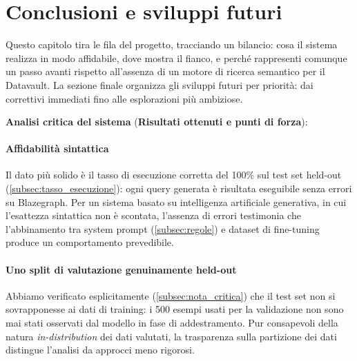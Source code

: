\chapter{Conclusioni e sviluppi futuri}\label{chap:conclusioni}

Questo capitolo tira le fila del progetto, tracciando un bilancio: cosa il sistema realizza in modo affidabile, dove mostra il fianco, e perché rappresenti comunque un passo avanti rispetto all'assenza di un motore di ricerca semantico per il Datavault.
La sezione finale organizza gli sviluppi futuri per priorità: dai correttivi immediati fino alle esplorazioni più ambiziose.

\textbf{Analisi critica del sistema} (\textbf{Risultati ottenuti e punti di forza}):\label{sec:orgoglio_modestia}

\subsubsection{Affidabilità sintattica}

Il dato più solido è il tasso di esecuzione corretta del 100\% sul test set held-out (\cref{subsec:tasso_esecuzione}): ogni query generata è risultata eseguibile senza errori su Blazegraph. Per un sistema basato su intelligenza artificiale generativa, in cui l'esattezza sintattica non è scontata, l'assenza di errori testimonia che l'abbinamento tra system prompt (\cref{subsec:regole}) e dataset di fine-tuning produce un comportamento prevedibile.

\subsubsection{Uno split di valutazione genuinamente held-out}

Abbiamo verificato esplicitamente (\cref{subsec:nota_critica}) che il test set non si sovrapponesse ai dati di training: i 500 esempi usati per la validazione non sono mai stati osservati dal modello in fase di addestramento. Pur consapevoli della natura \textit{in-distribution} dei dati valutati, la trasparenza sulla partizione dei dati distingue l'analisi da approcci meno rigorosi.



